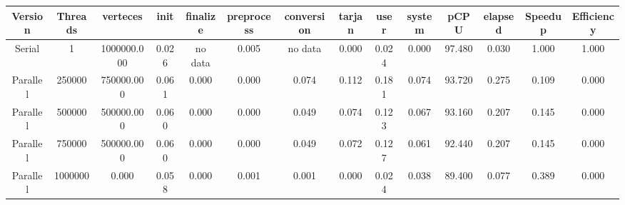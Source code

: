 \begin{tabular}{|c|c|c|c|c|c|c|c|c|c|c|c|c|c|}
\toprule
 Version &  Threads &    verteces &  init & finalize &  preprocess & conversion &  tarjan &  user &  system &   pCPU &  elapsed &  Speedup &  Efficiency \\
\midrule
  Serial &        1 & 1000000.000 & 0.026 &  no data &       0.005 &    no data &   0.000 & 0.024 &   0.000 & 97.480 &    0.030 &    1.000 &       1.000 \\
Parallel &   250000 &  750000.000 & 0.061 &    0.000 &       0.000 &      0.074 &   0.112 & 0.181 &   0.074 & 93.720 &    0.275 &    0.109 &       0.000 \\
Parallel &   500000 &  500000.000 & 0.060 &    0.000 &       0.000 &      0.049 &   0.074 & 0.123 &   0.067 & 93.160 &    0.207 &    0.145 &       0.000 \\
Parallel &   750000 &  500000.000 & 0.060 &    0.000 &       0.000 &      0.049 &   0.072 & 0.127 &   0.061 & 92.440 &    0.207 &    0.145 &       0.000 \\
Parallel &  1000000 &       0.000 & 0.058 &    0.000 &       0.001 &      0.001 &   0.000 & 0.024 &   0.038 & 89.400 &    0.077 &    0.389 &       0.000 \\
\bottomrule
\end{tabular}
